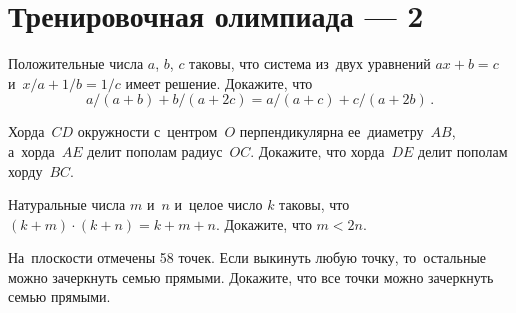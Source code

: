 
\section*{Тренировочная олимпиада --- 2}


\begin{problems}

\item
Положительные числа $a$, $b$, $c$ таковы, что система из~двух уравнений
$a x + b = c$ и~$x / a + 1 / b = 1 / c$ имеет решение.
Докажите, что
\[
    a / (a + b) + b / (a + 2 c) = a / (a + c) + c / (a + 2 b)
\,.\]

\item
Хорда~$CD$ окружности с~центром~$O$ перпендикулярна ее~диаметру~$AB$,
а~хорда~$AE$ делит пополам радиус~$OC$.
Докажите, что хорда~$DE$ делит пополам хорду~$BC$.

\item
Натуральные числа $m$ и~$n$ и~целое число $k$ таковы, что
$(k + m) \cdot (k + n) = k + m + n$.
Докажите, что $m < 2 n$.

\item
На~плоскости отмечены 58 точек.
Если выкинуть любую точку, то~остальные можно зачеркнуть семью прямыми.
Докажите, что все точки можно зачеркнуть семью прямыми.

\end{problems}

